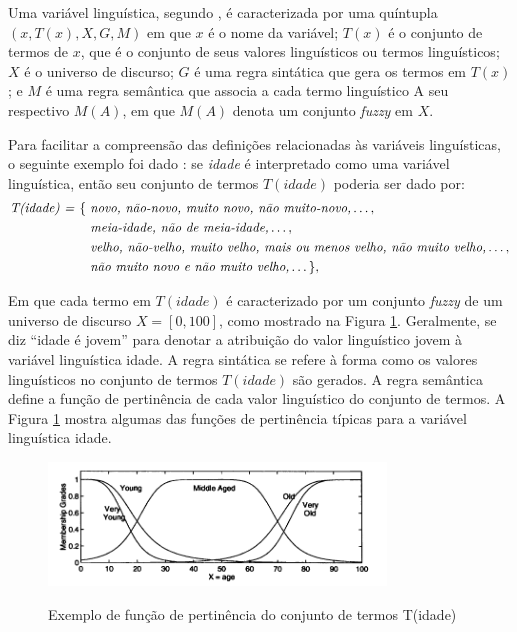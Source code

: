 Uma variável linguística, segundo , é caracterizada por uma quíntupla $(x,T(x),X,G,M)$ em que $x$ é o nome da variável; $T(x)$ é o conjunto de termos de $x$, que é o conjunto de seus valores linguísticos ou termos linguísticos; $X$ é o universo de discurso; $G$ é uma regra sintática que gera os termos em $T(x)$; e $M$ é uma regra semântica que associa a cada termo linguístico A seu respectivo $M(A)$, em que $M(A)$ denota um conjunto \textit{fuzzy} em $X$.

Para facilitar a compreensão das definições relacionadas às variáveis linguísticas, o seguinte exemplo foi dado \cite[p.~55]{Jang1997}: se \textit{idade} é interpretado como uma variável linguística, então seu conjunto de termos $T(idade)$ poderia ser dado por:
\begin{align*}
\mbox{\textit{T(idade) = }}\{ &\mbox{ \textit{novo, não-novo, muito novo, não muito-novo,}} \dots, \\
&\mbox{ \textit{meia-idade, não de meia-idade,}} \dots, \\
&\mbox{ \textit{velho, não-velho, muito velho, mais ou menos velho, não muito velho,}} \dots, \\
&\mbox{ \textit{não muito novo e não muito velho,}} \dots \},
\end{align*}

Em que cada termo em $T(idade)$ é caracterizado por um conjunto \textit{fuzzy} de um universo de discurso $X = [0,100]$, como mostrado na Figura \ref{fig:fuzzy_rules_jang}. Geralmente, se diz ``idade é jovem'' para denotar a atribuição do valor linguístico jovem à variável linguística idade. A regra sintática se refere à forma como os valores linguísticos no conjunto de termos $T(idade)$ são gerados. A regra semântica define a função de pertinência de cada valor linguístico do conjunto de termos. A Figura \ref{fig:fuzzy_rules_jang} mostra algumas das funções de pertinência típicas para a variável linguística idade.

\begin{figure}[!htb]
    \centering
    \caption{Exemplo de função de pertinência do conjunto de termos T(idade)}
    \includegraphics[width=0.8\textwidth]{./04-figuras/fund_teorica/fuzzy_rules_jang}
    \label{fig:fuzzy_rules_jang}
\end{figure}

